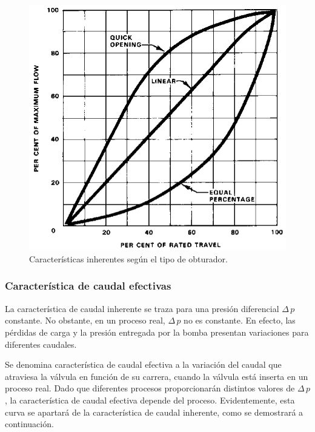 \begin{figure}[t]
 \centering
 \includegraphics[scale=1.5]{Cap2-DisenoEnsamblado/images/Inherente.png}
 \caption{Características inherentes según el tipo de obturador.}
 \label{fig:caractInherente}
\end{figure}


\subsubsection{Característica de caudal efectivas}

La característica de caudal inherente se traza para una presión diferencial
$\Delta \,p$ constante.
No obstante, en un proceso real, $\Delta \,p$ no es constante.
En efecto, las pérdidas de carga y la presión entregada por la bomba presentan
variaciones para diferentes caudales.

Se denomina característica de caudal efectiva a la variación del
caudal que atraviesa la válvula en función de su carrera, cuando la
válvula está inserta en un proceso real.
Dado que diferentes procesos proporcionarán distintos valores de  $\Delta
\,p$, la característica de caudal efectiva depende del proceso.
Evidentemente, esta curva se apartará de la característica de caudal inherente,
como se demostrará a continuación.

